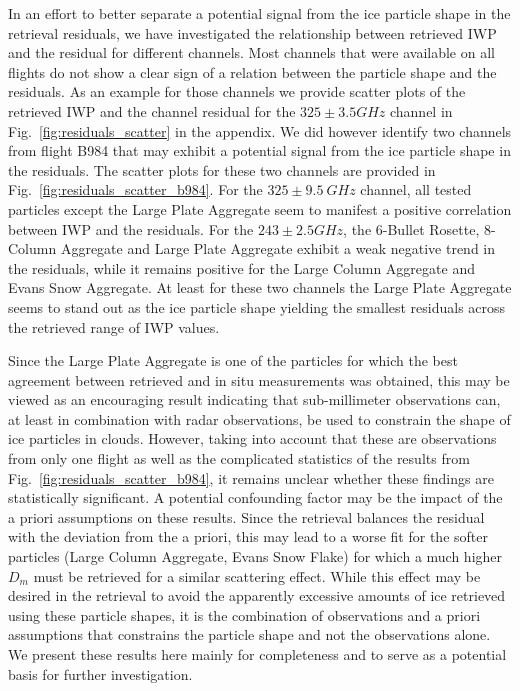 \documentclass[journal abbreviation, manuscript]{copernicus}
\begin{document}
In an effort to better separate a potential signal from the ice particle shape
in the retrieval residuals, we have investigated the relationship between
retrieved IWP and the residual for different channels. Most channels that were
available on all flights do not show a clear sign of a relation between the
particle shape and the residuals. As an example for those channels we provide
scatter plots of the retrieved IWP and the channel residual for the $325 \pm 3.5
\unit{GHz}$ channel in Fig.~\ref{fig:residuals_scatter} in the appendix. We did
however identify two channels from flight B984 that may exhibit a potential
signal from the ice particle shape in the residuals. The scatter plots for these
two channels are provided in Fig.~\ref{fig:residuals_scatter_b984}. For the $325
\pm 9.5\ \unit{GHz}$ channel, all tested particles except the Large Plate
Aggregate seem to manifest a positive correlation between IWP and the residuals.
For the $243 \pm 2.5 \unit{GHz}$, the 6-Bullet Rosette, 8-Column Aggregate
and Large Plate Aggregate exhibit a weak negative trend in the residuals, while it
remains positive for the Large Column Aggregate and Evans Snow Aggregate. At
least for these two channels the Large Plate Aggregate seems to stand out as the
ice particle shape yielding the smallest residuals across the retrieved range of
IWP values.

Since the Large Plate Aggregate is one of the particles for which the best
agreement between retrieved and in situ measurements was obtained, this may be
viewed as an encouraging result indicating that sub-millimeter observations can,
at least in combination with radar observations, be used to constrain the shape
of ice particles in clouds. However, taking into account that these are
observations from only one flight as well as the complicated statistics of the
results from Fig.~\ref{fig:residuals_scatter_b984}, it remains unclear whether
these findings are statistically significant. A potential confounding factor may
be the impact of the a priori assumptions on these results. Since the retrieval
balances the residual with the deviation from the a priori, this may lead to a
worse fit for the softer particles (Large Column Aggregate, Evans Snow Flake)
for which a much higher $D_m$ must be retrieved for a similar scattering effect.
While this effect may be desired in the retrieval to avoid the apparently
excessive amounts of ice retrieved using these particle shapes, it is the
combination of observations and a priori assumptions that constrains the
particle shape and not the observations alone. We present these results here
mainly for completeness and to serve as a potential basis for further
investigation.
\end{document}

